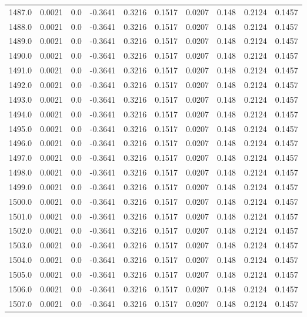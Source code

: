 \begin{longtable}{lrrrrrrrrr}
1487.0 & 0.0021 & 0.0 & -0.3641 & 0.3216 & 0.1517 & 0.0207 & 0.148 & 0.2124 & 0.1457 \\
1488.0 & 0.0021 & 0.0 & -0.3641 & 0.3216 & 0.1517 & 0.0207 & 0.148 & 0.2124 & 0.1457 \\
1489.0 & 0.0021 & 0.0 & -0.3641 & 0.3216 & 0.1517 & 0.0207 & 0.148 & 0.2124 & 0.1457 \\
1490.0 & 0.0021 & 0.0 & -0.3641 & 0.3216 & 0.1517 & 0.0207 & 0.148 & 0.2124 & 0.1457 \\
1491.0 & 0.0021 & 0.0 & -0.3641 & 0.3216 & 0.1517 & 0.0207 & 0.148 & 0.2124 & 0.1457 \\
1492.0 & 0.0021 & 0.0 & -0.3641 & 0.3216 & 0.1517 & 0.0207 & 0.148 & 0.2124 & 0.1457 \\
1493.0 & 0.0021 & 0.0 & -0.3641 & 0.3216 & 0.1517 & 0.0207 & 0.148 & 0.2124 & 0.1457 \\
1494.0 & 0.0021 & 0.0 & -0.3641 & 0.3216 & 0.1517 & 0.0207 & 0.148 & 0.2124 & 0.1457 \\
1495.0 & 0.0021 & 0.0 & -0.3641 & 0.3216 & 0.1517 & 0.0207 & 0.148 & 0.2124 & 0.1457 \\
1496.0 & 0.0021 & 0.0 & -0.3641 & 0.3216 & 0.1517 & 0.0207 & 0.148 & 0.2124 & 0.1457 \\
1497.0 & 0.0021 & 0.0 & -0.3641 & 0.3216 & 0.1517 & 0.0207 & 0.148 & 0.2124 & 0.1457 \\
1498.0 & 0.0021 & 0.0 & -0.3641 & 0.3216 & 0.1517 & 0.0207 & 0.148 & 0.2124 & 0.1457 \\
1499.0 & 0.0021 & 0.0 & -0.3641 & 0.3216 & 0.1517 & 0.0207 & 0.148 & 0.2124 & 0.1457 \\
1500.0 & 0.0021 & 0.0 & -0.3641 & 0.3216 & 0.1517 & 0.0207 & 0.148 & 0.2124 & 0.1457 \\
1501.0 & 0.0021 & 0.0 & -0.3641 & 0.3216 & 0.1517 & 0.0207 & 0.148 & 0.2124 & 0.1457 \\
1502.0 & 0.0021 & 0.0 & -0.3641 & 0.3216 & 0.1517 & 0.0207 & 0.148 & 0.2124 & 0.1457 \\
1503.0 & 0.0021 & 0.0 & -0.3641 & 0.3216 & 0.1517 & 0.0207 & 0.148 & 0.2124 & 0.1457 \\
1504.0 & 0.0021 & 0.0 & -0.3641 & 0.3216 & 0.1517 & 0.0207 & 0.148 & 0.2124 & 0.1457 \\
1505.0 & 0.0021 & 0.0 & -0.3641 & 0.3216 & 0.1517 & 0.0207 & 0.148 & 0.2124 & 0.1457 \\
1506.0 & 0.0021 & 0.0 & -0.3641 & 0.3216 & 0.1517 & 0.0207 & 0.148 & 0.2124 & 0.1457 \\
1507.0 & 0.0021 & 0.0 & -0.3641 & 0.3216 & 0.1517 & 0.0207 & 0.148 & 0.2124 & 0.1457 \\

\end{longtable}
